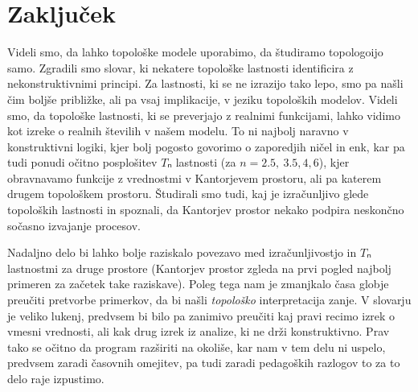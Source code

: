 \section{Zaključek}

Videli smo, da lahko topološke modele uporabimo, da študiramo topologoijo samo.
Zgradili smo slovar, ki nekatere topološke lastnosti identificira z
nekonstruktivnimi principi. Za lastnosti, ki se ne izrazijo tako lepo, smo pa
našli čim boljše približke, ali pa vsaj implikacije, v jeziku topoloških
modelov. Videli smo, da topološke lastnosti, ki se preverjajo z realnimi
funkcijami, lahko vidimo kot izreke o realnih številih v našem modelu. To ni
najbolj naravno v konstruktivni logiki, kjer bolj pogosto govorimo o zaporedjih
ničel in enk, kar pa tudi ponudi očitno posplošitev \(Tₙ\) lastnosti
(za \(n = 2.5,~3.5,4,6\)), kjer obravnavamo funkcije z vrednostmi v Kantorjevem
prostoru, ali pa katerem drugem topološkem prostoru. Študirali smo tudi, kaj je
izračunljivo glede topoloških lastnosti in spoznali, da Kantorjev prostor nekako
podpira neskončno sočasno izvajanje procesov.

Nadaljno delo bi lahko bolje raziskalo povezavo med izračunljivostjo in \(Tₙ\)
lastnostmi za druge prostore (Kantorjev prostor zgleda na prvi pogled najbolj
primeren za začetek take raziskave). Poleg tega nam je zmanjkalo časa globje
preučiti pretvorbe primerkov, da bi našli \emph{topološko} interpretacija zanje.
V slovarju je veliko lukenj, predvsem bi bilo pa zanimivo preučiti kaj pravi
recimo izrek o vmesni vrednosti, ali kak drug izrek iz analize, ki ne drži
konstruktivno. Prav tako se očitno da program razširiti na okoliše, kar nam v
tem delu ni uspelo, predvsem zaradi časovnih omejitev, pa tudi zaradi pedagoških
razlogov to za to delo raje izpustimo.



